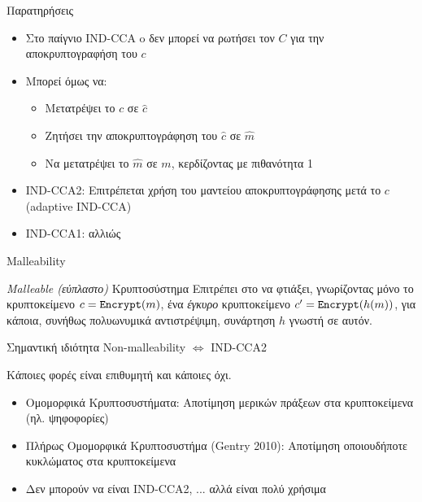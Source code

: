 \documentclass[handout]{beamer}
\begin{document}
\begin{frame}{Παρατηρήσεις}
\begin{itemize}
\item Στο παίγνιο IND-CCA o \adv δεν μπορεί να ρωτήσει τον $C$ για την αποκρυπτογραφήση του $c$
\item Μπορεί όμως να:
\begin{itemize}
\item Μετατρέψει το $c$ σε $\hat{c}$
\item Ζητήσει την αποκρυπτογράφηση του $\hat{c}$ σε $\hat{m}$
\item Να μετατρέψει το $\hat{m}$ σε $m$, κερδίζοντας με πιθανότητα 1
\end{itemize}
\pause
\item IND-CCA2: Επιτρέπεται χρήση του μαντείου αποκρυπτογράφησης μετά το $c$ (adaptive IND-CCA)
\item IND-CCA1: αλλιώς
\end{itemize}
\end{frame}

\begin{frame}[allowframebreaks]{Malleability}

\begin{block}{\emph{Malleable (εύπλαστο)} Κρυπτοσύστημα}
Επιτρέπει στο \adv να φτιάξει, γνωρίζοντας μόνο το κρυπτοκείμενο $c=\mathtt{Encrypt}(m)$, ένα \emph{έγκυρο} κρυπτοκείμενο $c'=\mathtt{Encrypt}(h(m))$, για κάποια, συνήθως πολυωνυμικά αντιστρέψιμη, συνάρτηση $h$ γνωστή σε αυτόν. 
\end{block}
 

\begin{block}{Σημαντική ιδιότητα}
Non-malleability $\Leftrightarrow$ IND-CCA2
\end{block}

\framebreak

Κάποιες φορές είναι επιθυμητή και κάποιες όχι.
\begin{itemize}
\item Ομομορφικά Κρυπτοσυστήματα: Αποτίμηση μερικών πράξεων στα κρυπτοκείμενα (ηλ. ψηφοφορίες)
\item Πλήρως Ομομορφικά Κρυπτοσυστήμα (Gentry 2010): Αποτίμηση οποιουδήποτε κυκλώματος στα κρυπτοκείμενα
\item Δεν μπορούν να είναι IND-CCA2, ... αλλά είναι πολύ χρήσιμα
\end{itemize}
 
 
\end{frame}
\end{document}
